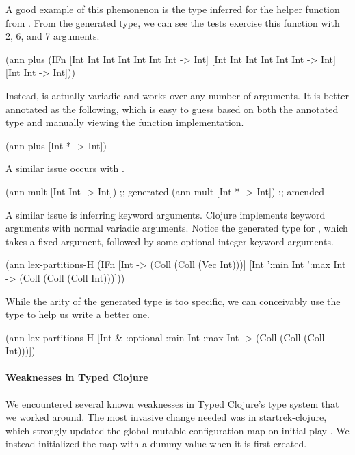 A good example of this phemonenon is the type inferred
for the  helper function from .
From the generated type, we can see the tests exercise this function with 2, 6,
and 7 arguments.

\begin{cljlisting}
(ann plus (IFn [Int Int Int Int Int Int Int -> Int]
               [Int Int Int Int Int Int -> Int]
               [Int Int -> Int]))
\end{cljlisting}

Instead,  is actually variadic and works over any number of arguments.
It is better annotated as the following, which is easy to guess based on
both the annotated type and manually viewing the function implementation.

\begin{cljlisting}
(ann plus [Int * -> Int])
\end{cljlisting}

A similar issue occurs with .

\begin{cljlisting}
(ann mult [Int Int -> Int]) ;; generated
(ann mult [Int * -> Int])   ;; amended
\end{cljlisting}

A similar issue is inferring keyword arguments. Clojure implements
keyword arguments with normal variadic arguments. Notice
the generated type for ,
which takes a fixed argument, followed by some optional integer keyword
arguments. 

\begin{cljlisting}
(ann lex-partitions-H
  (IFn [Int -> (Coll (Coll (Vec Int)))]
       [Int ':min Int ':max Int 
        -> (Coll (Coll (Coll Int)))]))
\end{cljlisting}

While the arity of the generated type is too specific,
we can conceivably use the type to help us write a better one.

\begin{cljlisting}
(ann lex-partitions-H
  [Int & :optional {:min Int :max Int}
   -> (Coll (Coll (Coll Int)))])
\end{cljlisting}

\paragraph{Weaknesses in Typed Clojure}

We encountered several known weaknesses in Typed Clojure's type system
that we worked around.
%
The most invasive change needed was in startrek-clojure, which
strongly updated the global mutable configuration map on initial
play . We instead initialized the map with a dummy
value when it is first created.

